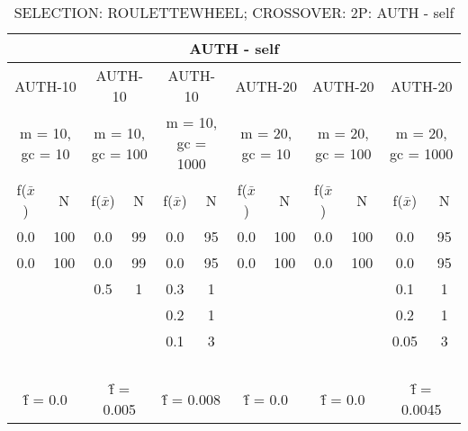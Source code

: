\begin{table}[H]
	\centering
	\caption{SELECTION: ROULETTEWHEEL; CROSSOVER: 2P: AUTH - self}
	\begin{adjustbox}{width=1\textwidth}
		\begin{tabular}{ |c|c||c|c||c|c||c|c||c|c||c|c| }
			\hline
			\multicolumn{12}{|c|}{AUTH - self} \\
			\hline
			\multicolumn{2}{|c||}{AUTH-10} & \multicolumn{2}{c||}{AUTH-10} & \multicolumn{2}{c||}{AUTH-10} & \multicolumn{2}{c||}{AUTH-20} & \multicolumn{2}{c||}{AUTH-20} & \multicolumn{2}{c|}{AUTH-20}\\
			\hline
			\multicolumn{2}{|c||}{m = 10, gc = 10} & \multicolumn{2}{c||}{m = 10, gc = 100} & \multicolumn{2}{c||}{m = 10, gc = 1000} & \multicolumn{2}{c||}{m = 20, gc = 10} & \multicolumn{2}{c||}{m = 20, gc = 100} & \multicolumn{2}{c|}{m = 20, gc = 1000}\\
			\hline
			f($\bar{x}$) & N & f($\bar{x}$) & N & f($\bar{x}$) & N & f($\bar{x}$) & N & f($\bar{x}$) & N & f($\bar{x}$) & N\\
			\hline
			\hline
			0.0 & 100 & 0.0 & 99 & 0.0 & 95 & 0.0 & 100 & 0.0 & 100 & 0.0 & 95\\
			\hline
			0.0 & 100 & 0.0 & 99 & 0.0 & 95 & 0.0 & 100 & 0.0 & 100 & 0.0 & 95\\
			&   & 0.5 & 1 & 0.3 & 1 &   &   &   &   & 0.1 & 1\\
			&   &   &   & 0.2 & 1 &   &   &   &   & 0.2 & 1\\
			&   &   &   & 0.1 & 3 &   &   &   &   & 0.05 & 3\\
			&   &   &   &   &   &   &   &   &   &   &  \\
			&   &   &   &   &   &   &   &   &   &   &  \\
			&   &   &   &   &   &   &   &   &   &   &  \\
			&   &   &   &   &   &   &   &   &   &   &  \\
			\hline
			\multicolumn{2}{|c||}{\^{f} = 0.0} & \multicolumn{2}{c||}{\^{f} = 0.005} & \multicolumn{2}{c||}{\^{f} = 0.008} & \multicolumn{2}{c||}{\^{f} = 0.0} & \multicolumn{2}{c||}{\^{f} = 0.0} & \multicolumn{2}{c|}{\^{f} = 0.0045}\\
			\hline
		\end{tabular}
	\end{adjustbox}
\end{table}
